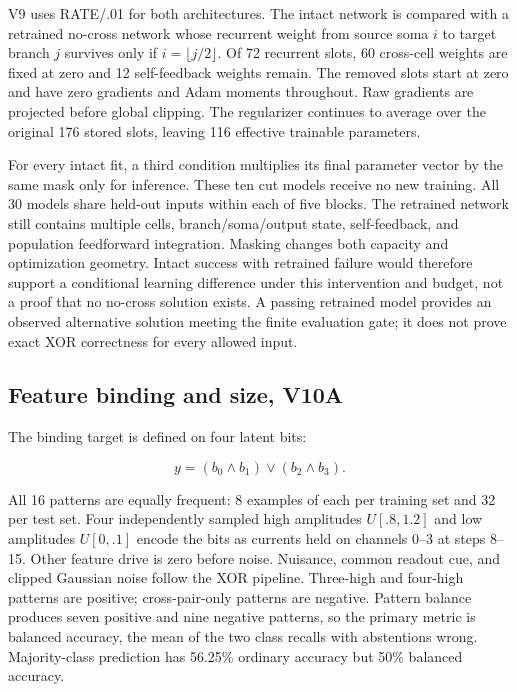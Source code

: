 \documentclass[
  10pt,
]{article}
\begin{document}
V9 uses RATE/.01 for both architectures. The intact network is compared
with a retrained no-cross network whose recurrent weight from source
soma \(i\) to target branch \(j\) survives only if
\(i=\lfloor j/2\rfloor\). Of 72 recurrent slots, 60 cross-cell weights
are fixed at zero and 12 self-feedback weights remain. The removed slots
start at zero and have zero gradients and Adam moments throughout. Raw
gradients are projected before global clipping. The regularizer
continues to average over the original 176 stored slots, leaving 116
effective trainable parameters.

For every intact fit, a third condition multiplies its final parameter
vector by the same mask only for inference. These ten cut models receive
no new training. All 30 models share held-out inputs within each of five
blocks. The retrained network still contains multiple cells,
branch/soma/output state, self-feedback, and population feedforward
integration. Masking changes both capacity and optimization geometry.
Intact success with retrained failure would therefore support a
conditional learning difference under this intervention and budget, not
a proof that no no-cross solution exists. A passing retrained model
provides an observed alternative solution meeting the finite evaluation
gate; it does not prove exact XOR correctness for every allowed input.

\subsection{Feature binding and size,
V10A}\label{feature-binding-and-size-v10a}

The binding target is defined on four latent bits:

\[y=(b_0\land b_1)\lor(b_2\land b_3).\]

All 16 patterns are equally frequent: 8 examples of each per training
set and 32 per test set. Four independently sampled high amplitudes
\(U[.8,1.2]\) and low amplitudes \(U[0,.1]\) encode the bits as currents
held on channels 0--3 at steps 8--15. Other feature drive is zero before
noise. Nuisance, common readout cue, and clipped Gaussian noise follow
the XOR pipeline. Three-high and four-high patterns are positive;
cross-pair-only patterns are negative. Pattern balance produces seven
positive and nine negative patterns, so the primary metric is balanced
accuracy, the mean of the two class recalls with abstentions wrong.
Majority-class prediction has 56.25\% ordinary accuracy but 50\%
balanced accuracy.
\end{document}
